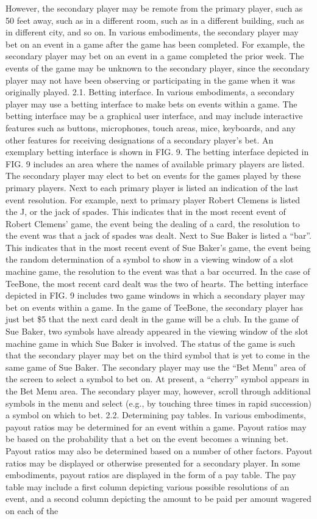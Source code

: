 \documentclass[11pt,a4paper]{article}
\begin{document}
However, the secondary player may be remote from the primary player, such as 50 feet away, such as in a different room, such as in a different building, such as in different city, and so on. In various embodiments, the secondary player may bet on an event in a game after the game has been completed. For example, the secondary player may bet on an event in a game completed the prior week. The events of the game may be unknown to the secondary player, since the secondary player may not have been observing or participating in the game when it was originally played. 2.1. Betting interface. In various embodiments, a secondary player may use a betting interface to make bets on events within a game. The betting interface may be a graphical user interface, and may include interactive features such as buttons, microphones, touch areas, mice, keyboards, and any other features for receiving designations of a secondary player's bet. An exemplary betting interface is shown in FIG. 9. The betting interface depicted in FIG. 9 includes an area where the names of available primary players are listed. The secondary player may elect to bet on events for the games played by these primary players. Next to each primary player is listed an indication of the last event resolution. For example, next to primary player Robert Clemens is listed the J, or the jack of spades. This indicates that in the most recent event of Robert Clemens' game, the event being the dealing of a card, the resolution to the event was that a jack of spades was dealt. Next to Sue Baker is listed a “bar”. This indicates that in the most recent event of Sue Baker's game, the event being the random determination of a symbol to show in a viewing window of a slot machine game, the resolution to the event was that a bar occurred. In the case of TeeBone, the most recent card dealt was the two of hearts. The betting interface depicted in FIG. 9 includes two game windows in which a secondary player may bet on events within a game. In the game of TeeBone, the secondary player has just bet \$5 that the next card dealt in the game will be a club. In the game of Sue Baker, two symbols have already appeared in the viewing window of the slot machine game in which Sue Baker is involved. The status of the game is such that the secondary player may bet on the third symbol that is yet to come in the same game of Sue Baker. The secondary player may use the “Bet Menu” area of the screen to select a symbol to bet on. At present, a “cherry” symbol appears in the Bet Menu area. The secondary player may, however, scroll through additional symbols in the menu and select (e.g., by touching three times in rapid succession) a symbol on which to bet. 2.2. Determining pay tables. In various embodiments, payout ratios may be determined for an event within a game. Payout ratios may be based on the probability that a bet on the event becomes a winning bet. Payout ratios may also be determined based on a number of other factors. Payout ratios may be displayed or otherwise presented for a secondary player. In some embodiments, payout ratios are displayed in the form of a pay table. The pay table may include a first column depicting various possible resolutions of an event, and a second column depicting the amount to be paid per amount wagered on each of the 
\end{document}
